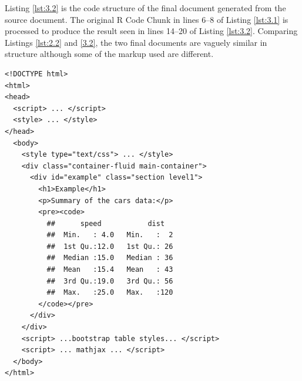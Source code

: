 \documentclass[a4paper, 12pt]{report}
\begin{document}
Listing \ref{lst:3.2} is the code structure of the final document generated from the source document. The original R Code Chunk in lines 6--8 of Listing \ref{lst:3.1} is processed to produce the result seen in lines 14--20 of Listing \ref{lst:3.2}. Comparing Listings \ref{lst:2.2} and \ref{3.2}, the two final documents are vaguely similar in structure although some of the markup used are different.

\begin{lstlisting}[caption={(tidied) \texttt{example2.html}}, escapechar=\|, label={lst:3.2}]
<!DOCTYPE html>
<html>
<head>
  <script> ... </script>
  <style> ... </style>
</head>
  <body>
    <style type="text/css"> ... </style>
    <div class="container-fluid main-container">
      <div id="example" class="section level1">
        <h1>Example</h1>
        <p>Summary of the cars data:</p>
        <pre><code>
          ##      speed           dist    
    	  ##  Min.   : 4.0   Min.   :  2  
    	  ##  1st Qu.:12.0   1st Qu.: 26  
    	  ##  Median :15.0   Median : 36  
    	  ##  Mean   :15.4   Mean   : 43  
    	  ##  3rd Qu.:19.0   3rd Qu.: 56  
    	  ##  Max.   :25.0   Max.   :120
    	</code></pre>
      </div>
    </div>
    <script> ...bootstrap table styles... </script>
    <script> ... mathjax ... </script>    
  </body>
</html>
\end{lstlisting}
\end{document}
